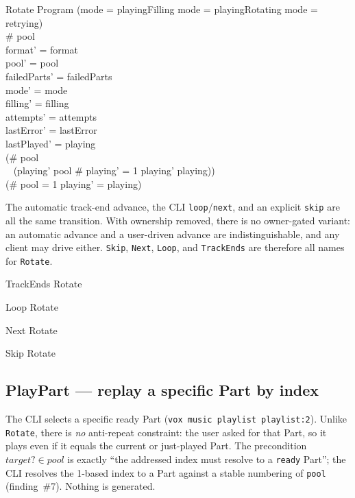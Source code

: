 \documentclass[a4paper,10pt,fleqn]{article}
\begin{document}
\begin{schema}{Rotate}
  \Delta Program
  \where
  (mode = playingFilling \lor mode = playingRotating \lor mode = retrying) \\
  \# pool  \\
  format' = format \\
  pool' = pool \\
  failedParts' = failedParts \\
  mode' = mode \\
  filling' = filling \\
  attempts' = attempts \\
  lastError' = lastError \\
  lastPlayed' = playing \\
  (\# pool  \implies \\
    \quad~ (playing' \subseteq pool \land \# playing' = 1 \land playing' \neq playing)) \\
  (\# pool = 1 \implies playing' = playing)
\end{schema}

The automatic track-end advance, the CLI \texttt{loop}/\texttt{next}, and an
explicit \texttt{skip} are all the same transition. With ownership removed,
there is no owner-gated variant: an automatic advance and a user-driven advance
are indistinguishable, and any client may drive either. \texttt{Skip},
\texttt{Next}, \texttt{Loop}, and \texttt{TrackEnds} are therefore all names for
\texttt{Rotate}.

\begin{zed}
  TrackEnds  Rotate
\end{zed}

\begin{zed}
  Loop  Rotate
\end{zed}

\begin{zed}
  Next  Rotate
\end{zed}

\begin{zed}
  Skip  Rotate
\end{zed}

\subsection{PlayPart --- replay a specific Part by index}

The CLI selects a specific ready Part (\texttt{vox music playlist playlist:2}).
Unlike \texttt{Rotate}, there is \emph{no} anti-repeat constraint: the user
asked for that Part, so it plays even if it equals the current or just-played
Part. The precondition $target? \in pool$ is exactly ``the addressed index must
resolve to a \texttt{ready} Part''; the CLI resolves the 1-based index to a Part
against a stable numbering of \texttt{pool} (finding~\#7). Nothing is generated.
\end{document}
